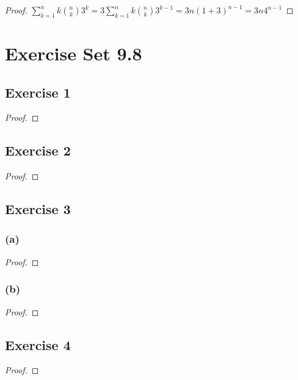 \documentclass[14pt]{extarticle}
\newcommand{\dps}{\displaystyle}
\begin{document}
\begin{proof}
\(\dps \sum_{k=1}^{n} k \binom{n}{k} 3^k = 3 \sum_{k=1}^{n} k \binom{n}{k} 3^{k-1} = 3n(1+3)^{n-1} = 3n4^{n-1}\)
\end{proof}

\section{Exercise Set 9.8}

\subsection{Exercise 1}

\begin{proof}

\end{proof}

\subsection{Exercise 2}

\begin{proof}

\end{proof}

\subsection{Exercise 3}

\subsubsection{(a)}

\begin{proof}

\end{proof}

\subsubsection{(b)}

\begin{proof}

\end{proof}

\subsection{Exercise 4}

\begin{proof}

\end{proof}
\end{document}
